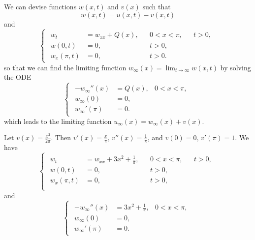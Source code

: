 \documentclass[plain]{pset}
\begin{document}
\begin{solution}
    We can devise functions \(w(x, t)\) and \(v(x)\) such that
    \[w(x, t) = u(x, t) - v(x, t)\]
    and
    \[
        \begin{cases}
            \begin{aligned}
                w_t         & = w_{xx} + Q(x), &  & 0 < x < \pi, &  & t > 0, \\
                w(0, t)     & = 0,             &  & t > 0,                   \\
                w_x(\pi, t) & = 0,             &  & t > 0.
            \end{aligned}
        \end{cases}
    \]
    so that we can find the limiting function \(w_\infty(x) = \lim_{t \to \infty} w(x, t)\) by solving the ODE
    \[
        \begin{cases}
            \begin{aligned}
                -w_\infty''(x) & = Q(x), & 0 < x < \pi, \\
                w_\infty(0)    & = 0,                   \\
                w_\infty'(\pi) & = 0.
            \end{aligned}
        \end{cases}
    \]
    which leads to the limiting function \(u_\infty(x) = w_\infty(x) + v(x)\).

    Let \(v(x) = \frac{x^2}{2\pi}\). Then \(v'(x) = \frac{x}{\pi}, \, v''(x) = \frac{1}{\pi}\), and \(v(0) = 0, \, v'(\pi) = 1\). We have
    \[
        \begin{cases}
            \begin{aligned}
                w_t         & = w_{xx} + 3x^2 + \frac{1}{\pi}, &  & 0 < x < \pi, &  & t > 0, \\
                w(0, t)     & = 0,                             &  & t > 0,                   \\
                w_x(\pi, t) & = 0,                             &  & t > 0,                   \\
            \end{aligned}
        \end{cases}
    \]
    and
    \[
        \begin{cases}
            \begin{aligned}
                -w_\infty''(x) & = 3x^2 + \frac{1}{\pi}, & 0 < x < \pi, \\
                w_\infty(0)    & = 0,                                   \\
                w_\infty'(\pi) & = 0.
            \end{aligned}
        \end{cases}
    \]
    

\end{solution}
\end{document}

